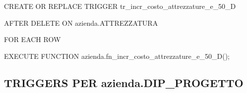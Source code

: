     \ttfamily
        \begin{flushleft}
            \begin{description}
                \item CREATE OR REPLACE TRIGGER tr\_incr\_costo\_attrezzature\_e\_50\_D
                \item AFTER DELETE ON azienda.ATTREZZATURA
                \item FOR EACH ROW
                \item EXECUTE FUNCTION azienda.fn\_incr\_costo\_attrezzature\_e\_50\_D();
            \end{description}
        \end{flushleft}
    \normalfont


\newpage

    \subsection{TRIGGERS PER azienda.DIP\_PROGETTO}

